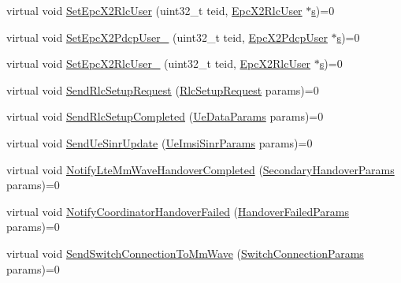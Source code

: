\begin{DoxyCompactItemize}
\item 
virtual void \hyperlink{classns3_1_1EpcX2SapProvider_a4a535ae1c2e037456b1dc8c413929a2d}{Set\+Epc\+X2\+Rlc\+User} (uint32\+\_\+t teid, \hyperlink{classns3_1_1EpcX2RlcUser}{Epc\+X2\+Rlc\+User} $\ast$\hyperlink{generate__test__data__lte__sinr_8m_ad83eeb3a142285d1243a08c6b7026df8}{s})=0
\item 
virtual void \hyperlink{classns3_1_1EpcX2SapProvider_a0c06f5cc5b52a2409bed46841c49fca2}{Set\+Epc\+X2\+Pdcp\+User\+\_} (uint32\+\_\+t teid, \hyperlink{classns3_1_1EpcX2PdcpUser}{Epc\+X2\+Pdcp\+User} $\ast$\hyperlink{generate__test__data__lte__sinr_8m_ad83eeb3a142285d1243a08c6b7026df8}{s})=0
\item 
virtual void \hyperlink{classns3_1_1EpcX2SapProvider_afceee67656a685e33251eea353cfd3d0}{Set\+Epc\+X2\+Rlc\+User\+\_} (uint32\+\_\+t teid, \hyperlink{classns3_1_1EpcX2RlcUser}{Epc\+X2\+Rlc\+User} $\ast$\hyperlink{generate__test__data__lte__sinr_8m_ad83eeb3a142285d1243a08c6b7026df8}{s})=0
\item 
virtual void \hyperlink{classns3_1_1EpcX2SapProvider_a4b9e79e7bc6367ee76fd43be4724fe64}{Send\+Rlc\+Setup\+Request} (\hyperlink{structns3_1_1EpcX2Sap_1_1RlcSetupRequest}{Rlc\+Setup\+Request} params)=0
\item 
virtual void \hyperlink{classns3_1_1EpcX2SapProvider_a27f388454b22deac936ec2c53015ad6d}{Send\+Rlc\+Setup\+Completed} (\hyperlink{structns3_1_1EpcX2Sap_1_1UeDataParams}{Ue\+Data\+Params} params)=0
\item 
virtual void \hyperlink{classns3_1_1EpcX2SapProvider_a431f9f70f69d9c6a7cd6d09c75719855}{Send\+Ue\+Sinr\+Update} (\hyperlink{structns3_1_1EpcX2Sap_1_1UeImsiSinrParams}{Ue\+Imsi\+Sinr\+Params} params)=0
\item 
virtual void \hyperlink{classns3_1_1EpcX2SapProvider_a507ba3a13c3c0098935679ff1b0f2e4d}{Notify\+Lte\+Mm\+Wave\+Handover\+Completed} (\hyperlink{structns3_1_1EpcX2Sap_1_1SecondaryHandoverParams}{Secondary\+Handover\+Params} params)=0
\item 
virtual void \hyperlink{classns3_1_1EpcX2SapProvider_a602a5b409a43c5a707cb5ce098d22ff3}{Notify\+Coordinator\+Handover\+Failed} (\hyperlink{structns3_1_1EpcX2Sap_1_1HandoverFailedParams}{Handover\+Failed\+Params} params)=0
\item 
virtual void \hyperlink{classns3_1_1EpcX2SapProvider_a806b329260b0dd1c39050d89550418cf}{Send\+Switch\+Connection\+To\+Mm\+Wave} (\hyperlink{structns3_1_1EpcX2Sap_1_1SwitchConnectionParams}{Switch\+Connection\+Params} params)=0
\item 

\end{DoxyCompactItemize}

